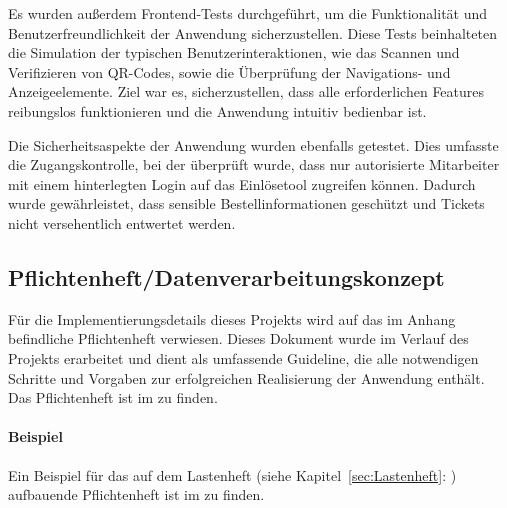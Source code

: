 Es wurden außerdem Frontend-Tests durchgeführt, um die Funktionalität und Benutzerfreundlichkeit der Anwendung sicherzustellen. Diese Tests beinhalteten die Simulation der typischen Benutzerinteraktionen, wie das Scannen und Verifizieren von QR-Codes, sowie die Überprüfung der Navigations- und Anzeigeelemente. Ziel war es, sicherzustellen, dass alle erforderlichen Features reibungslos funktionieren und die Anwendung intuitiv bedienbar ist.

Die Sicherheitsaspekte der Anwendung wurden ebenfalls getestet. Dies umfasste die Zugangskontrolle, bei der überprüft wurde, dass nur autorisierte Mitarbeiter mit einem hinterlegten Login auf das Einlösetool zugreifen können. Dadurch wurde gewährleistet, dass sensible Bestellinformationen geschützt und Tickets nicht versehentlich entwertet werden.

\subsection{Pflichtenheft/Datenverarbeitungskonzept}
\label{sec:Pflichtenheft}

Für die Implementierungsdetails dieses Projekts wird auf das im Anhang befindliche Pflichtenheft verwiesen. Dieses Dokument wurde im Verlauf des Projekts erarbeitet und dient als umfassende Guideline, die alle notwendigen Schritte und Vorgaben zur erfolgreichen Realisierung der Anwendung enthält. Das Pflichtenheft ist im  zu finden.

\paragraph{Beispiel}
Ein Beispiel für das auf dem Lastenheft (siehe Kapitel~\ref{sec:Lastenheft}: ) aufbauende Pflichtenheft ist im  zu finden.
